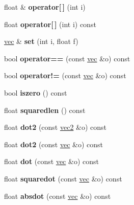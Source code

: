 \begin{DoxyCompactItemize}
\mbox{\label{structvec_a820e9f5c3f8e7e8af73e91305c1659d5}} 
float \& {\bfseries operator\mbox{[}$\,$\mbox{]}} (int i)
\item 
\mbox{\label{structvec_aa002d54c3f86c8786fa6ff93354100db}} 
float {\bfseries operator\mbox{[}$\,$\mbox{]}} (int i) const
\item 
\mbox{\label{structvec_ad33a0fb49c92121325f07d745d988059}} 
\hyperlink{structvec}{vec} \& {\bfseries set} (int i, float f)
\item 
\mbox{\label{structvec_a742f210966500fdf4d7d0d3e29bc2b50}} 
bool {\bfseries operator==} (const \hyperlink{structvec}{vec} \&o) const
\item 
\mbox{\label{structvec_a3cff7d53d1ae431bd0a6055a10fc2a97}} 
bool {\bfseries operator!=} (const \hyperlink{structvec}{vec} \&o) const
\item 
\mbox{\label{structvec_a8802d4817af30c532299464a6c06f355}} 
bool {\bfseries iszero} () const
\item 
\mbox{\label{structvec_a1caee5eb1da968d38fa4f8dfedff0669}} 
float {\bfseries squaredlen} () const
\item 
\mbox{\label{structvec_a653ee6be19d4ba5033d30796708a838c}} 
float {\bfseries dot2} (const \hyperlink{structvec2}{vec2} \&o) const
\item 
\mbox{\label{structvec_a94b6773e06a4895fbc80db812cfae638}} 
float {\bfseries dot2} (const \hyperlink{structvec}{vec} \&o) const
\item 
\mbox{\label{structvec_af1f2e26c711344b042f2256091d94cc1}} 
float {\bfseries dot} (const \hyperlink{structvec}{vec} \&o) const
\item 
\mbox{\label{structvec_a2b0f3c2c6aad8d1b293e36b786c0ca3e}} 
float {\bfseries squaredot} (const \hyperlink{structvec}{vec} \&o) const
\item 
\mbox{\label{structvec_ad16a8e9676a45d20bd01d9e0e19d4ab8}} 
float {\bfseries absdot} (const \hyperlink{structvec}{vec} \&o) const

\end{DoxyCompactItemize}
